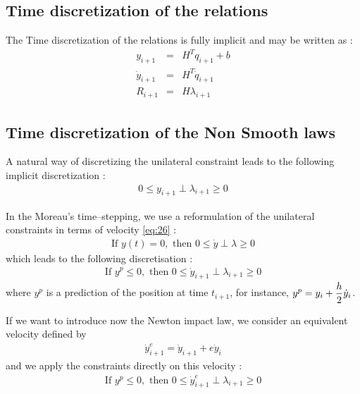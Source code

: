 \documentclass[10pt]{article}
\begin{document}
\subsection{Time discretization of the relations}
The Time discretization of the relations is fully implicit and may be written as :
\begin{eqnarray}
  \label{eq:25}
      y_{i+1} &=& H^{T} q_{i+1} + b\\
      \dot y_{i+1} &=& H^{T}\dot q_{i+1} \\
      R_{i+1} &=& H \lambda_{i+1}
\end{eqnarray}

\subsection{Time discretization of the Non Smooth laws}



A natural way of discretizing the unilateral constraint  leads to the following implicit discretization :
\begin{eqnarray}
  \label{eq:26}
  0 \leq y_{i+1} \perp  \lambda_{i+1}  \geq 0
\end{eqnarray}

In the Moreau's time--stepping, we use a reformulation of the unilateral constraints in terms of velocity \eqref{eq:26} :
\begin{eqnarray}
  \label{eq:27}
   \text{If } y(t) =0, \text{ then } 0 \leq \dot y \perp  \lambda  \geq 0
\end{eqnarray}
which leads to the following discretisation :
\begin{eqnarray}
  \label{eq:28}
   \text{If } y^{p} \leq 0, \text{ then } 0 \leq \dot y_{i+1} \perp  \lambda_{i+1}  \geq 0
\end{eqnarray}
 where $y^{p}$ is a prediction of the position at time $t_{i+1}$, for instance,    $y^{p} = y_{i} + \displaystyle \frac{h}{2}  \dot y_i$.

If we want to introduce now the Newton impact law, we consider an equivalent velocity defined by
\begin{eqnarray}
  \label{eq:29}
  \dot y^{e}_{i+1} = \dot y_{i+1} + e \dot y_{i}
\end{eqnarray}
and we apply the constraints directly on this velocity :
\begin{eqnarray}
  \label{eq:30}
  \text{If } y^{p} \leq 0, \text{ then } 0 \leq \dot y^{e}_{i+1} \perp  \lambda_{i+1}  \geq 0
\end{eqnarray}
\end{document}
